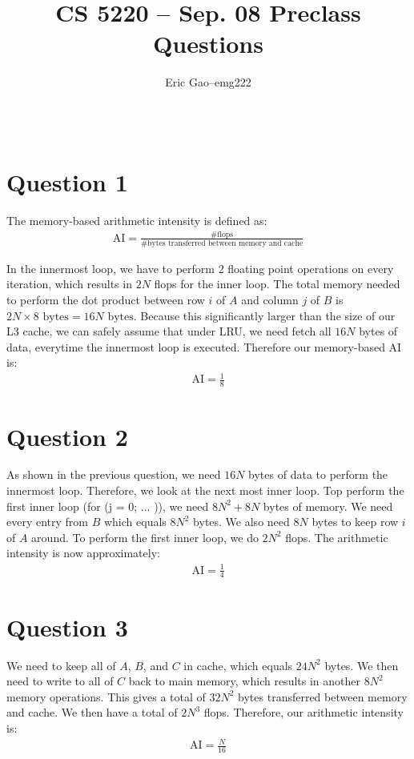 \documentclass[11pt]{article}
\title{CS 5220 -- Sep. 08 Preclass Questions} %
\author{
  \begin{tabular}{l c l}
    Eric Gao & -- & emg222\\
  \end{tabular}\\
  \rule{\linewidth}{0.4pt}
}
\date{}
\begin{document}
    \thispagestyle{empty}
    \maketitle

    \section*{Question 1}
        The memory-based arithmetic intensity is defined as:
        \begin{align*}
            \text{AI} = \frac{\text{\# flops}}{\text{\# bytes transferred between memory and cache}}
        \end{align*}

        In the innermost loop, we have to perform 2 floating point operations on every iteration, which results in $2N$ flops for the inner loop. The total memory needed to perform the dot product between row $i$ of $A$ and column $j$ of $B$ is $2N\times 8\text{ bytes} = 16N\text{ bytes}$. Because this significantly larger than the size of our L3 cache, we can safely assume that under LRU, we need fetch all $16N$ bytes of data, everytime the innermost loop is executed. Therefore our memory-based AI is:
        \begin{align*}
            \text{AI} = \frac{1}{8}
        \end{align*}

    \section*{Question 2}
        As shown in the previous question, we need $16N$ bytes of data to perform the innermost loop. Therefore, we look at the next most inner loop. Top perform the first inner loop (for (j = 0; ... )), we need $8N^2 + 8N$ bytes of memory. We need every entry from $B$ which equals $8N^2$ bytes. We also need $8N$ bytes to keep row $i$ of $A$ around. To perform the first inner loop, we do $2N^2$ flops. The arithmetic intensity is now approximately:
        \begin{align*}
            \text{AI} = \frac{1}{4}
        \end{align*}

    \section*{Question 3}
        We need to keep all of $A$, $B$, and $C$ in cache, which equals $24N^2$ bytes. We then need to write to all of $C$ back to main memory, which results in another $8N^2$ memory operations. This gives a total of $32N^2$ bytes transferred between memory and cache. We then have a total of $2N^3$ flops. Therefore, our arithmetic intensity is:
        \begin{align*}
            \text{AI} = \frac{N}{16}
        \end{align*}
\end{document}
